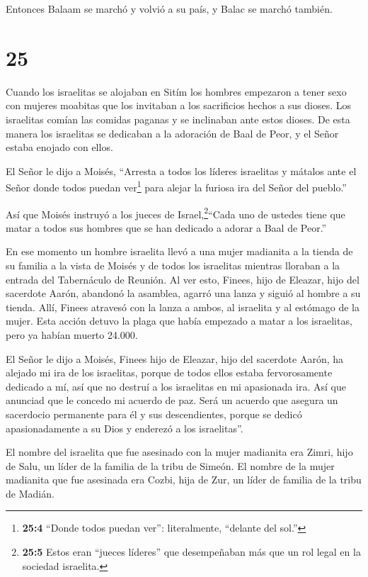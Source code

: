  Entonces Balaam se marchó y volvió a su país, y Balac se
marchó también.

\hypertarget{section-24}{%
\section{25}\label{section-24}}

 Cuando los israelitas se alojaban en Sitím los hombres
empezaron a tener sexo con mujeres moabitas  que los
invitaban a los sacrificios hechos a sus dioses. Los israelitas comían
las comidas paganas y se inclinaban ante estos dioses.  De
esta manera los israelitas se dedicaban a la adoración de Baal de Peor,
y el Señor estaba enojado con ellos.

 El Señor le dijo a Moisés, ``Arresta a todos los líderes
israelitas y mátalos ante el Señor donde todos puedan ver\footnote{\textbf{25:4}
  ``Donde todos puedan ver'': literalmente, ``delante del sol.''} para
alejar la furiosa ira del Señor del pueblo.''

 Así que Moisés instruyó a los jueces de
Israel,\footnote{\textbf{25:5} Estos eran ``jueces líderes'' que
  desempeñaban más que un rol legal en la sociedad israelita.}``Cada uno
de ustedes tiene que matar a todos sus hombres que se han dedicado a
adorar a Baal de Peor.''

 En ese momento un hombre israelita llevó a una mujer
madianita a la tienda de su familia a la vista de Moisés y de todos los
israelitas mientras lloraban a la entrada del Tabernáculo de Reunión.
 Al ver esto, Finees, hijo de Eleazar, hijo del sacerdote
Aarón, abandonó la asamblea, agarró una lanza  y siguió al
hombre a su tienda. Allí, Finees atravesó con la lanza a ambos, al
israelita y al estómago de la mujer. Esta acción detuvo la plaga que
había empezado a matar a los israelitas,  pero ya habían
muerto 24.000.

 El Señor le dijo a Moisés,  Finees hijo de
Eleazar, hijo del sacerdote Aarón, ha alejado mi ira de los israelitas,
porque de todos ellos estaba fervorosamente dedicado a mí, así que no
destruí a los israelitas en mi apasionada ira.  Así que
anunciad que le concedo mi acuerdo de paz.  Será un acuerdo
que asegura un sacerdocio permanente para él y sus descendientes, porque
se dedicó apasionadamente a su Dios y enderezó a los israelitas''.

 El nombre del israelita que fue asesinado con la mujer
madianita era Zimri, hijo de Salu, un líder de la familia de la tribu de
Simeón.  El nombre de la mujer madianita que fue asesinada
era Cozbi, hija de Zur, un líder de familia de la tribu de Madián.


